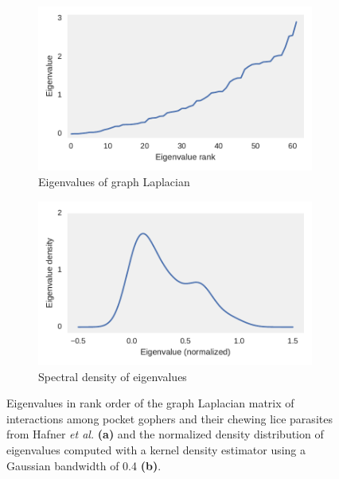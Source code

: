 
\begin{figure}
    \centering
    \begin{subfigure}[b]{0.45\textwidth}
        \includegraphics[width=\textwidth]{FishPoo/figures/gopher_louse_eigenvalues}
        \small
        \caption{Eigenvalues of graph Laplacian}
    \end{subfigure}
    \begin{subfigure}[b]{0.45\textwidth}
        \includegraphics[width=\textwidth]{FishPoo/figures/gopher_louse_spectral_density}
        \small
        \caption{Spectral density of eigenvalues}
    \end{subfigure}
    \caption{Eigenvalues in rank order of the graph Laplacian matrix of interactions among pocket gophers and their chewing lice parasites from Hafner {\em et al.} \cite{hafner1994disparate} \textbf{(a)} and the normalized density distribution of eigenvalues computed with a kernel density estimator using a Gaussian bandwidth of 0.4 \textbf{(b)}. }
    \label{fig:FP_eigendensity}
\end{figure}
